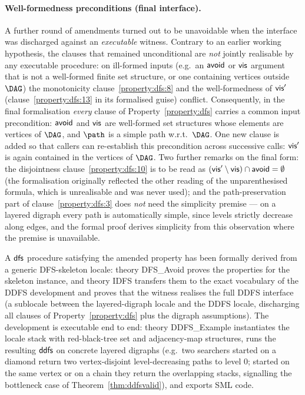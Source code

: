 \paragraph{Well-formedness preconditions (final interface).}
A further round of amendments turned out to be unavoidable when the interface was
discharged against an \emph{executable} witness.  Contrary to an earlier working
hypothesis, the clauses that remained unconditional are \emph{not} jointly realisable
by any executable procedure: on ill-formed inputs (e.g.\ an $\textsf{\upshape avoid}$ or $\textsf{\upshape vis}$
argument that is not a well-formed finite set structure, or one containing vertices
outside $\DAG$) the monotonicity clause~\ref{property:dfs:8} and the well-formedness
of $\textsf{\upshape vis}'$ (clause~\ref{property:dfs:13} in its formalised guise) conflict.
Consequently, in the final formalisation \emph{every} clause of
Property~\ref{property:dfs} carries a common input precondition: $\textsf{\upshape avoid}$ and $\textsf{\upshape vis}$
are well-formed set structures whose elements are vertices of $\DAG$, and $\path$ is
a simple path w.r.t.\ $\DAG$.  One new clause is added so that callers can
re-establish this precondition across successive calls: $\textsf{\upshape vis}'$ is again contained in
the vertices of $\DAG$.  Two further remarks on the final form: the disjointness
clause~\ref{property:dfs:10} is to be read as
$(\textsf{\upshape vis}'\setminus\textsf{\upshape vis})\cap\textsf{\upshape avoid}=\emptyset$ (the formalisation originally reflected
the other reading of the unparenthesised formula, which is unrealisable and was never
used); and the path-preservation part of clause~\ref{property:dfs:3} does \emph{not}
need the simplicity premise --- on a layered digraph every path is automatically
simple, since levels strictly decrease along edges, and the formal proof derives
simplicity from this observation where the premise is unavailable.

A $\textsf{\upshape dfs}$ procedure satisfying the amended property has been formally derived from a
generic DFS-skeleton locale: theory \textsf{DFS\_Avoid} proves the properties for the
skeleton instance, and theory \textsf{IDFS} transfers them to the exact vocabulary of
the DDFS development and proves that the witness realises the full DDFS interface (a
\textsf{sublocale} between the layered-digraph locale and the DDFS locale, discharging
all clauses of Property~\ref{property:dfs} plus the digraph assumptions).  The
development is executable end to end: theory \textsf{DDFS\_Example} instantiates the
locale stack with red-black-tree set and adjacency-map structures, runs the resulting
$\textsf{\upshape ddfs}$ on concrete layered digraphs (e.g.\ two searchers started on a diamond return
two vertex-disjoint level-decreasing paths to level $0$; started on the same vertex or
on a chain they return the overlapping stacks, signalling the bottleneck case of
Theorem~\ref{thm:ddfsvalid}), and exports SML code.

